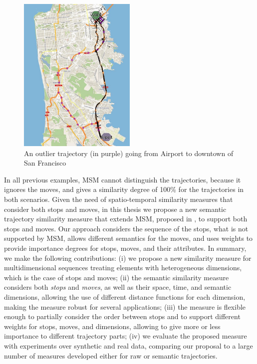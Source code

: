 \begin{figure}[h]
\centering
\includegraphics[width=0.5\textwidth]{Images/CRAWDAD-Outlier.jpg}
\caption{\label{fig:CRAWDAD_outlier} An outlier trajectory (in purple) going from Airport to downtown of San Francisco}
\end{figure}

In all previous examples, MSM cannot distinguish the trajectories, because it ignores the moves, and gives a similarity degree of 100\% for the trajectories in both scenarios.
Given the need of spatio-temporal similarity measures that consider both stops and moves, in this thesis we propose a new semantic trajectory similarity measure that extends MSM, proposed in \cite{Furtado:TGIS12156}, to support both stops and moves. Our approach considers the sequence of the stops, what is not supported by MSM, allows different semantics for the moves, and uses weights to provide importance degrees for stops, moves, and their attributes. 
In summary, we make the following contributions:
(i) we propose a new similarity measure for multidimensional sequences treating elements with heterogeneous dimensions, which is the case of stops and moves; (ii) the semantic similarity measure considers both \textit{stops} and \textit{moves}, as well as their space, time, and semantic dimensions, allowing the use of different distance functions for each dimension, making the measure robust for several applications; (iii) the measure is flexible enough to partially consider the order between stops and to support different weights for stops, moves, and dimensions, allowing to give more or less importance to different trajectory parts; (iv) we evaluate the proposed measure with experiments over synthetic and real data, comparing our proposal to a large number of measures developed either for raw or semantic trajectories.

